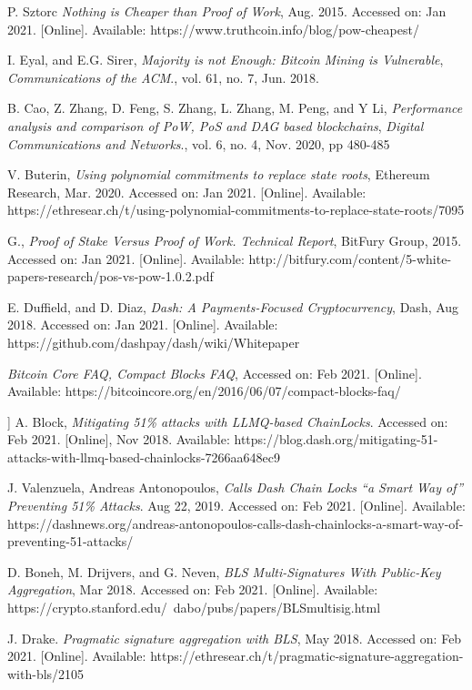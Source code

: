\documentclass[peerreview]{ieeesyscoin}
\begin{document}
\begin{thebibliography}{00}
 P. Sztorc \textit{Nothing is Cheaper than Proof of Work}, Aug. 2015. Accessed on: Jan 2021. [Online]. Available: https://www.truthcoin.info/blog/pow-cheapest/

 I. Eyal, and E.G. Sirer, \textit{Majority is not Enough: Bitcoin Mining is Vulnerable}, \emph{Communications of the ACM}., vol. 61, no. 7, Jun. 2018.

 B. Cao, Z. Zhang, D. Feng, S. Zhang, L. Zhang, M. Peng, and
Y Li, \textit{Performance analysis and comparison of PoW, PoS and DAG based blockchains}, \emph{Digital Communications and Networks}., vol. 6, no. 4, Nov. 2020, pp 480-485

 V. Buterin, \textit{Using polynomial commitments to replace state roots}, Ethereum Research, Mar. 2020. Accessed on: Jan 2021. [Online]. Available: https://ethresear.ch/t/using-polynomial-commitments-to-replace-state-roots/7095

 G., \textit{Proof of Stake Versus Proof of Work. Technical Report}, BitFury Group, 2015. Accessed on: Jan 2021. [Online]. Available: http://bitfury.com/content/5-white-papers-research/pos-vs-pow-1.0.2.pdf 

 E. Duffield, and D. Diaz, \textit{Dash: A Payments-Focused Cryptocurrency}, Dash, Aug 2018. Accessed on: Jan 2021. [Online]. Available: https://github.com/dashpay/dash/wiki/Whitepaper

 \textit{Bitcoin Core FAQ, Compact Blocks FAQ}, Accessed on: Feb 2021. [Online]. Available: https://bitcoincore.org/en/2016/06/07/compact-blocks-faq/

 ] A. Block, \textit{Mitigating 51\% attacks with LLMQ-based ChainLocks}. Accessed on: Feb 2021. [Online], Nov 2018. Available: https://blog.dash.org/mitigating-51-attacks-with-llmq-based-chainlocks-7266aa648ec9

 J. Valenzuela, Andreas Antonopoulos, \textit{Calls Dash Chain Locks “a Smart Way of” Preventing 51\% Attacks}. Aug 22, 2019. Accessed on: Feb 2021. [Online]. Available: https://dashnews.org/andreas-antonopoulos-calls-dash-chainlocks-a-smart-way-of-preventing-51-attacks/

 D. Boneh, M. Drijvers, and G. Neven, \textit{BLS Multi-Signatures With Public-Key Aggregation}, Mar 2018. Accessed on: Feb 2021. [Online]. Available: https://crypto.stanford.edu/~dabo/pubs/papers/BLSmultisig.html

 J. Drake. \textit{Pragmatic signature aggregation with BLS}, May 2018. Accessed on: Feb 2021. [Online]. Available:  https://ethresear.ch/t/pragmatic-signature-aggregation-with-bls/2105


\end{thebibliography}
\end{document}
